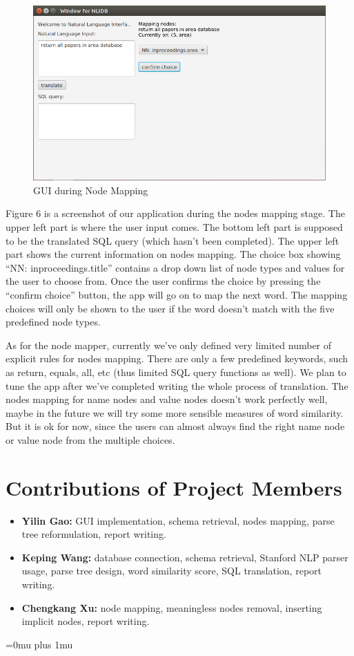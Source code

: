 \documentclass[twocolumn]{article}
\begin{document}
\begin{figure}[ht]
  \centering
  \includegraphics[width=0.7\linewidth]{figures/gui_nodes_mapping.png}
  \caption{GUI during Node Mapping}
\end{figure}

Figure 6 is a screenshot of our application during the nodes mapping stage. The upper left part is where the user input comes. The bottom left part is supposed to be the translated SQL query (which hasn’t been completed). The upper left part shows the current information on nodes mapping. The choice box showing “NN: inproceedings.title” contains a drop down list of node types and values for the user to choose from. Once the user confirms the choice by pressing the “confirm choice” button, the app will go on to map the next word. The mapping choices will only be shown to the user if the word doesn’t match with the five predefined node types.

As for the node mapper, currently we’ve only defined very limited number of explicit rules for nodes mapping. There are only a few predefined keywords, such as return, equals, all, etc (thus limited SQL query functions as well). We plan to tune the app after we’ve completed writing the whole process of translation. The nodes mapping for name nodes and value nodes doesn’t work perfectly well, maybe in the future we will try some more sensible measures of word similarity. But it is ok for now, since the users can almost always find the right name node or value node from the multiple choices. 

\section{Contributions of Project Members}

\begin{itemize}
\item {\bf Yilin Gao:} GUI implementation, schema retrieval, nodes mapping, parse tree reformulation, report writing.
\item {\bf Keping Wang:} database connection, schema retrieval, Stanford NLP parser usage, parse tree design, word similarity score, SQL translation, report writing.
\item {\bf Chengkang Xu:} node mapping, meaningless nodes removal, inserting implicit nodes, report writing.
\end{itemize}


\Urlmuskip=0mu plus 1mu\relax


\end{document}
